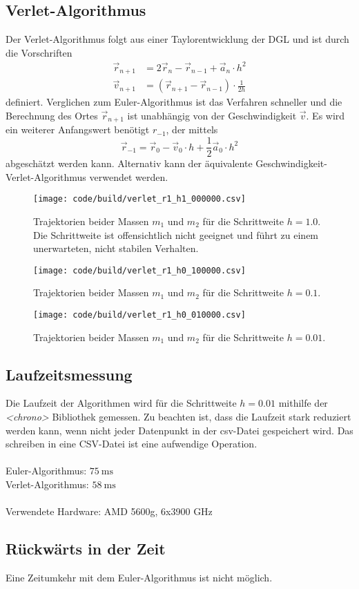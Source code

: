 \subsection{Verlet-Algorithmus}
Der Verlet-Algorithmus folgt aus einer Taylorentwicklung der DGL und ist durch die Vorschriften
\begin{align}
    \vec{r}_{n+1} &= 2 \vec{r}_n - \vec{r}_{n-1} + \vec{a}_n \cdot h^2 \\
    \vec{v}_{n+1} &= (\vec{r}_{n+1} - \vec{r}_{n-1}) \cdot \frac{1}{2h} 
\end{align}
definiert.
Verglichen zum Euler-Algorithmus ist das Verfahren schneller und die Berechnung des Ortes $\vec{r}_{n+1}$ ist unabhängig von der Geschwindigkeit $\vec{v}$.
Es wird ein weiterer Anfangswert benötigt $r_{-1}$, der mittels
\begin{equation}
    \vec{r}_{-1} = \vec{r}_0 - \vec{v}_0 \cdot h + \frac{1}{2} \vec{a}_0 \cdot h^2
\end{equation}
abgeschätzt werden kann.
Alternativ kann der äquivalente Geschwindigkeit-Verlet-Algorithmus verwendet werden.
\begin{figure}
    \centering
    \texttt{[image: code/build/verlet\_r1\_h1\_000000.csv]}
    \caption{Trajektorien beider Massen $m_1$ und $m_2$ für die Schrittweite $h=1.0$.
    Die Schrittweite ist offensichtlich nicht geeignet und führt zu einem unerwarteten, nicht stabilen Verhalten.
    }
\end{figure}
\begin{figure}
    \centering
    \texttt{[image: code/build/verlet\_r1\_h0\_100000.csv]}
    \caption{Trajektorien beider Massen $m_1$ und $m_2$ für die Schrittweite $h=0.1$.
    }
\end{figure}
\begin{figure}
    \centering
    \texttt{[image: code/build/verlet\_r1\_h0\_010000.csv]}
    \caption{Trajektorien beider Massen $m_1$ und $m_2$ für die Schrittweite $h=0.01$.
    }
\end{figure}
\FloatBarrier

\subsection{Laufzeitsmessung}
Die Laufzeit der Algorithmen wird für die Schrittweite $h=0.01$ mithilfe der \textit{<chrono>} Bibliothek gemessen.
Zu beachten ist, dass die Laufzeit stark reduziert werden kann, wenn nicht jeder Datenpunkt in der csv-Datei gespeichert wird.
Das schreiben in eine CSV-Datei ist eine aufwendige Operation.
\\
\\

Euler-Algorithmus: $\qty{75}{\milli\second}$
\\
Verlet-Algorithmus: $\qty{58}{\milli\second}$
\\
\\
Verwendete Hardware: AMD 5600g, 6x3900 GHz

\subsection{Rückwärts in der Zeit}
Eine Zeitumkehr mit dem Euler-Algorithmus ist nicht möglich.